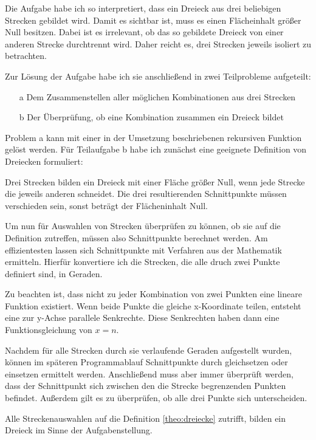 Die Aufgabe habe ich so interpretiert, dass ein Dreieck aus drei beliebigen Strecken
gebildet wird. Damit es sichtbar ist, muss es einen Flächeinhalt größer Null besitzen.
Dabei ist es irrelevant, ob das so gebildete Dreieck von einer
anderen Strecke durchtrennt wird.
Daher reicht es, drei Strecken jeweils isoliert zu betrachten.

Zur Lösung der Aufgabe habe ich sie anschließend in zwei Teilprobleme aufgeteilt:
\begin{itemize}
    \item[a] Dem Zusammenstellen aller möglichen Kombinationen aus drei Strecken
    \item[b] Der Überprüfung, ob eine Kombination zusammen ein Dreieck bildet
\end{itemize}

Problem a kann mit einer in der Umsetzung beschriebenen rekursiven Funktion gelöst werden.
Für Teilaufgabe b habe ich zunächst eine geeignete Definition von Dreiecken formuliert:
\begin{definition} \label{theo:dreiecke}
Drei Strecken bilden ein Dreieck mit einer Fläche größer Null,
wenn jede Strecke die jeweils anderen schneidet.
Die drei resultierenden Schnittpunkte müssen verschieden sein,
sonst beträgt der Flächeninhalt Null.
\end{definition}

Um nun für Auswahlen von Strecken überprüfen zu können, ob sie auf die Definition 
zutreffen, müssen also Schnittpunkte berechnet werden.
Am effizientesten lassen sich Schnittpunkte mit Verfahren aus der Mathematik ermitteln.
Hierfür konvertiere ich die Strecken, die alle druch zwei Punkte definiert sind, in Geraden.

Zu beachten ist, dass nicht zu jeder Kombination von zwei Punkten eine lineare
Funktion existiert. Wenn beide Punkte die gleiche x-Koordinate teilen, entsteht eine zur
y-Achse parallele Senkrechte. Diese Senkrechten haben dann eine Funktionsgleichung von
\(x=n\).

Nachdem für alle Strecken durch sie verlaufende Geraden aufgestellt wurden, können
im späteren Programmablauf Schnittpunkte durch gleichsetzen oder einsetzen ermittelt
werden. Anschließend muss aber immer überprüft werden, dass der Schnittpunkt sich
zwischen den die Strecke begrenzenden Punkten befindet. Außerdem gilt es zu überprüfen,
ob alle drei Punkte sich unterscheiden.

Alle Streckenauswahlen auf die Definition \ref{theo:dreiecke} zutrifft, bilden
ein Dreieck im Sinne der Aufgabenstellung.
